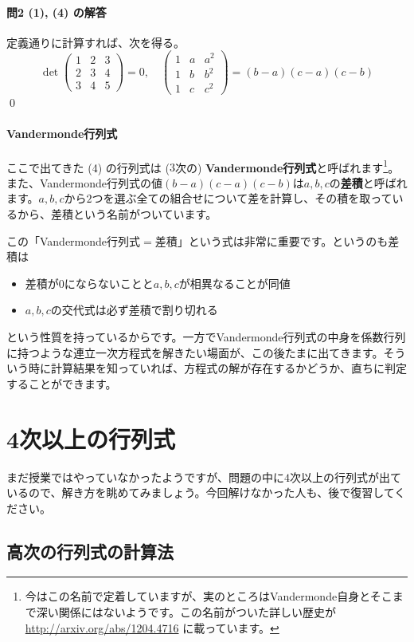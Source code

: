 \paragraph{問2 (1), (4) の解答} 定義通りに計算すれば、次を得る。
\[
\det
\begin{pmatrix}
1 & 2 & 3 \\
2 & 3 & 4 \\
3 & 4 & 5
\end{pmatrix}
= 0, \quad
\begin{pmatrix}
1 & a & a^2 \\
1 & b & b^2 \\
1 & c & c^2
\end{pmatrix}
= (b - a)(c - a)(c - b)
\]
\qed

\paragraph{Vandermonde行列式} ここで出てきた (4) の行列式は ($3$次の) \textbf{Vandermonde行列式}と呼ばれます\footnote{今はこの名前で定着していますが、実のところはVandermonde自身とそこまで深い関係にはないようです。この名前がついた詳しい歴史が \url{http://arxiv.org/abs/1204.4716} に載っています。}。また、Vandermonde行列式の値$(b - a)(c - a)(c - b)$は$a, b, c$の\textbf{差積}と呼ばれます。$a, b, c$から$2$つを選ぶ全ての組合せについて差を計算し、その積を取っているから、差積という名前がついています。

この「Vandermonde行列式$=$差積」という式は非常に重要です。というのも差積は
\begin{itemize}
\item 差積が$0$にならないことと$a, b, c$が相異なることが同値
\item $a, b, c$の交代式は必ず差積で割り切れる
\end{itemize}
という性質を持っているからです。一方でVandermonde行列式の中身を係数行列に持つような連立一次方程式を解きたい場面が、この後たまに出てきます。そういう時に計算結果を知っていれば、方程式の解が存在するかどうか、直ちに判定することができます。

\section{4次以上の行列式}

まだ授業ではやっていなかったようですが、問題の中に$4$次以上の行列式が出ているので、解き方を眺めてみましょう。今回解けなかった人も、後で復習してください。

\subsection{高次の行列式の計算法}

